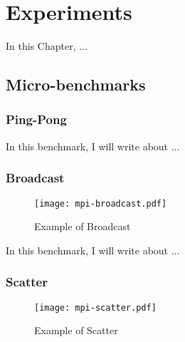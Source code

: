 \chapter{Experiments}
\label{ch.experiments}

    In this Chapter, ...

    \section{Micro-benchmarks}

        \subsection*{Ping-Pong}


            In this benchmark, I will write about ...

        \subsection*{Broadcast}

            \begin{figure}[!tb]
                \centering%
                \caption{Example of \mpi Broadcast}%
                \label{fig:software-stack}%
                \texttt{[image: mpi-broadcast.pdf]}%
            \end{figure}

            In this benchmark, I will write about ...

        \subsection*{Scatter}

            \begin{figure}[!tb]
                \centering%
                \caption{Example of \mpi Scatter}%
                \label{fig:software-stack}%
                \texttt{[image: mpi-scatter.pdf]}%
            \end{figure}

